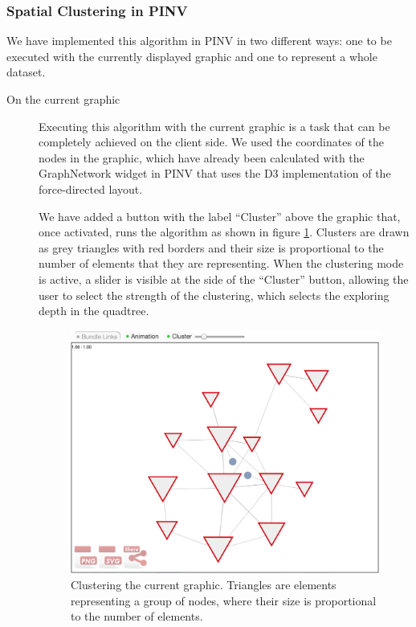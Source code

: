 \subsubsection{Spatial Clustering in PINV}
We have implemented this algorithm in PINV in two different ways: one to be executed with the currently displayed graphic and one to represent a whole dataset.

\begin{description}
\item[On the current graphic]
Executing this algorithm with the current graphic is a task that can be completely achieved on the client side. We used the coordinates of the nodes in the graphic, which have already been calculated with the GraphNetwork widget in PINV that uses the D3 implementation of the force-directed layout. 

We have added a button with the label ``Cluster'' above the graphic that, once activated, runs the algorithm as shown in figure \ref{fig:local_cluster}. Clusters are drawn as grey triangles with red borders and their size is proportional to the number of elements that they are representing. When the clustering mode is active, a slider is visible at the side of the ``Cluster'' button, allowing the user to select the strength of the clustering, which selects the exploring depth in the quadtree.

\begin{figure}[ht]
\centering
\includegraphics[width=\textwidth]{figures/local_cluster.png}
\caption[Clustering the current graphic.]{Clustering the current graphic. Triangles are elements representing a group of nodes, where their size is proportional to the number of elements.
\label{fig:local_cluster}}
\end{figure}


\end{description}
